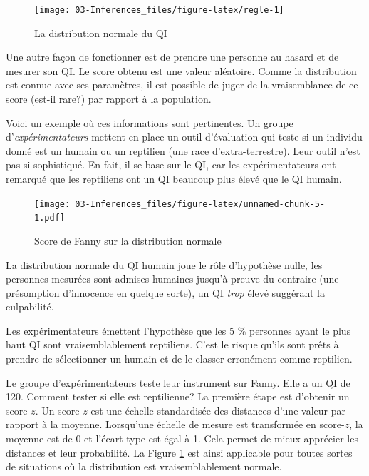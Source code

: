 \documentclass[
]{book}
\begin{document}
\begin{figure}

{\centering \texttt{[image: 03-Inferences\_files/figure-latex/regle-1]} 

}

\caption{La distribution normale du QI}\label{fig:regle}
\end{figure}

Une autre façon de fonctionner est de prendre une personne au hasard et de mesurer son QI. Le score obtenu est une valeur aléatoire. Comme la distribution est connue avec ses paramètres, il est possible de juger de la vraisemblance de ce score (est-il rare?) par rapport à la population.

Voici un exemple où ces informations sont pertinentes. Un groupe d'\emph{expérimentateurs} mettent en place un outil d'évaluation qui teste si un individu donné est un humain ou un reptilien (une race d'extra-terrestre). Leur outil n'est pas si sophistiqué. En fait, il se base sur le QI, car les expérimentateurs ont remarqué que les reptiliens ont un QI beaucoup plus élevé que le QI humain.

\begin{figure}
\centering
\texttt{[image: 03-Inferences\_files/figure-latex/unnamed-chunk-5-1.pdf]}
\caption{\label{fig:unnamed-chunk-5}Score de Fanny sur la distribution normale}
\end{figure}

La distribution normale du QI humain joue le rôle d'hypothèse nulle, les personnes mesurées sont admises humaines jusqu'à preuve du contraire (une présomption d'innocence en quelque sorte), un QI \emph{trop} élevé suggérant la culpabilité.

Les expérimentateurs émettent l'hypothèse que les 5 \% personnes ayant le plus haut QI sont vraisemblablement reptiliens. C'est le risque qu'ils sont prêts à prendre de sélectionner un humain et de le classer erronément comme reptilien.

Le groupe d'expérimentateurs teste leur instrument sur Fanny. Elle a un QI de 120. Comment tester si elle est reptilienne? La première étape est d'obtenir un score-\(z\). Un score-\(z\) est une échelle standardisée des distances d'une valeur par rapport à la moyenne. Lorsqu'une échelle de mesure est transformée en score-\(z\), la moyenne est de 0 et l'écart type est égal à 1. Cela permet de mieux apprécier les distances et leur probabilité. La Figure \ref{fig:regle} est ainsi applicable pour toutes sortes de situations où la distribution est vraisemblablement normale.
\end{document}
